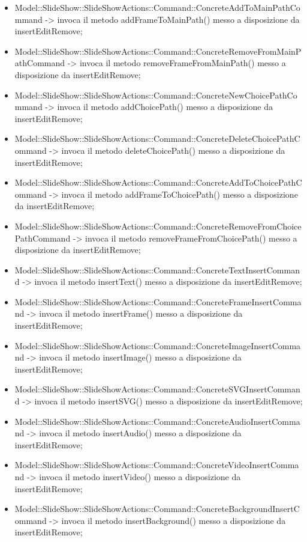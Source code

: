 {\begin{itemize}
			\item Model::\-SlideShow::\-SlideShowActions::\-Command::\-ConcreteAddToMainPathCommand -> invoca il metodo addFrameToMainPath() messo a disposizione da insertEditRemove;
			\item Model::\-SlideShow::\-SlideShowActions::\-Command::\-ConcreteRemoveFromMainPathCommand -> invoca il metodo removeFrameFromMainPath() messo a disposizione da insertEditRemove;
			\item Model::\-SlideShow::\-SlideShowActions::\-Command::\-ConcreteNewChoicePathCommand -> invoca il metodo addChoicePath() messo a disposizione da insertEditRemove;
			\item Model::\-SlideShow::\-SlideShowActions::\-Command::\-ConcreteDeleteChoicePathCommand -> invoca il metodo deleteChoicePath() messo a disposizione da insertEditRemove;
			\item Model::\-SlideShow::\-SlideShowActions::\-Command::\-ConcreteAddToChoicePathCommand -> invoca il metodo addFrameToChoicePath() messo a disposizione da insertEditRemove;
			\item Model::\-SlideShow::\-SlideShowActions::\-Command::\-ConcreteRemoveFromChoicePathCommand -> invoca il metodo removeFrameFromChoicePath() messo a disposizione da insertEditRemove;
					\item Model::\-SlideShow::\-SlideShowActions::\-Command::\-ConcreteTextInsertCommand -> invoca il metodo insertText() messo a disposizione da insertEditRemove;
		\item Model::\-SlideShow::\-SlideShowActions::\-Command::\-ConcreteFrameInsertCommand -> invoca il metodo insertFrame() messo a disposizione da insertEditRemove;
		\item Model::\-SlideShow::\-SlideShowActions::\-Command::\-ConcreteImageInsertCommand -> invoca il metodo insertImage() messo a disposizione da insertEditRemove;
		\item Model::\-SlideShow::\-SlideShowActions::\-Command::\-ConcreteSVGInsertCommand -> invoca il metodo insertSVG() messo a disposizione da insertEditRemove;
		\item Model::\-SlideShow::\-SlideShowActions::\-Command::\-ConcreteAudioInsertCommand -> invoca il metodo insertAudio() messo a disposizione da insertEditRemove;
		\item Model::\-SlideShow::\-SlideShowActions::\-Command::\-ConcreteVideoInsertCommand -> invoca il metodo insertVideo() messo a disposizione da insertEditRemove;
		\item Model::\-SlideShow::\-SlideShowActions::\-Command::\-ConcreteBackgroundInsertCommand -> invoca il metodo insertBackground() messo a disposizione da insertEditRemove;

\end{itemize}}
